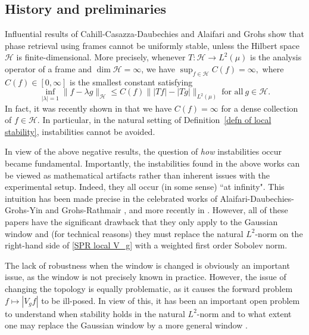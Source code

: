 \documentclass[11pt]{amsart}
\theoremstyle{remark}
\begin{document}
\subsection{History and preliminaries} Influential results of Cahill-Casazza-Daubechies \cite{MR3554699} and Alaifari and Grohs \cite{MR3656501} show that phase retrieval using frames  cannot be uniformly stable, unless the Hilbert space $\mathcal{H}$ is finite-dimensional. More precisely,  whenever $T:\mathcal{H} \to L^2(\mu)$ is the analysis operator of a frame and $\dim\mathcal{H}=\infty$, we have $\sup_{f\in \mathcal{H}}C(f)=\infty,$ where $C(f)\in [0,\infty]$ is the smallest constant satisfying
\begin{equation}\label{LSPR intro}
    \inf_{|\lambda|=1}\|f-\lambda g\|_{\mathcal{H}}\leq C(f)\| |Tf|-|Tg|\|_{L^2(\mu)} \ \text{for all} \ g\in \mathcal{H}.
\end{equation} 
 In fact, it was recently shown in \cite{Alharbi2024Locality} that we have $C(f)=\infty$ for a dense collection of $f\in \mathcal{H}$. In particular, in the natural setting of Definition~\ref{defn of local stability}, instabilities cannot be avoided. 
 \medskip

 In view of the above negative results, the question of \emph{how} instabilities occur became fundamental. Importantly, the instabilities found in the above works can be viewed as mathematical artifacts rather than inherent issues with the experimental setup. Indeed, they all occur (in some sense) ``at infinity". This intuition has been made precise in the celebrated works of Alaifari-Daubechies-Grohs-Yin \cite{alaifari2019Stable} and Grohs-Rathmair \cite{Grohs2019Stable,MR4404785}, and more recently in \cite{alaifari2025cheeger}. However, all of these papers have the significant drawback that they only apply to the Gaussian window and (for technical reasons) they must replace the natural $L^2$-norm on the right-hand side of \eqref{SPR local V_g} with a weighted first order Sobolev norm.
 \medskip
 
 The lack of robustness when the window is changed is obviously an important issue, as the window is not precisely known in practice. However, the issue of changing the topology is equally problematic, as it causes the forward problem $f\mapsto |V_gf|$ to be ill-posed. In view of this, it has been an important open problem to understand when stability holds in the natural $L^2$-norm and to what extent one may replace the Gaussian window by a more general window \cite{rathmair2024stable}.
\end{document}
